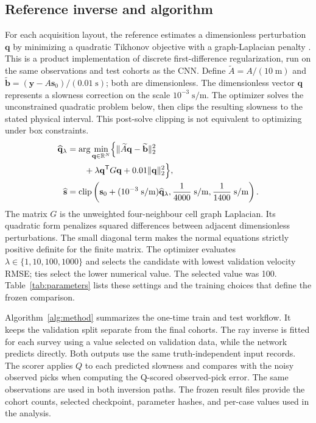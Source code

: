 \documentclass[11pt]{article}
\begin{document}
\subsection{Reference inverse and algorithm}
\label{sec:reference}
For each acquisition layout, the reference estimates a dimensionless perturbation $\mathbf{q}$ by minimizing a quadratic Tikhonov objective with a graph-Laplacian penalty \cite{Tikhonov1977}. This is a product implementation of discrete first-difference regularization, run on the same observations and test cohorts as the CNN. Define $\widetilde A=A/(10\;\mathrm{m})$ and $\widetilde{\mathbf b}=(\mathbf{y}-A\mathbf{s}_0)/(0.01\;\mathrm{s})$; both are dimensionless. The dimensionless vector $\mathbf q$ represents a slowness correction on the scale $10^{-3}\;\mathrm{s/m}$. The optimizer solves the unconstrained quadratic problem below, then clips the resulting slowness to the stated physical interval. This post-solve clipping is not equivalent to optimizing under box constraints.
\begin{equation}
\begin{aligned}
\widehat{\mathbf q}_{\lambda}&=\arg\min_{\mathbf q\in\mathbb R^N}\Bigl\{
\|\widetilde A\mathbf q-\widetilde{\mathbf b}\|_2^2\\
&\qquad+\lambda\mathbf q^{\mathsf T}G\mathbf q+0.01\|\mathbf q\|_2^2\Bigr\},\\
\widehat{\mathbf{s}}&=\operatorname{clip}\left(\mathbf{s}_0+(10^{-3}\;\mathrm{s/m})\widehat{\mathbf q}_{\lambda},\frac{1}{4000}\;\mathrm{s/m},\frac{1}{1400}\;\mathrm{s/m}\right).
\end{aligned}
\label{eq:reference}
\end{equation}
The matrix $G$ is the unweighted four-neighbour cell graph Laplacian. Its quadratic form penalizes squared differences between adjacent dimensionless perturbations. The small diagonal term makes the normal equations strictly positive definite for the finite matrix. The optimizer evaluates $\lambda\in\{1,10,100,1000\}$ and selects the candidate with lowest validation velocity RMSE; ties select the lower numerical value. The selected value was 100. Table~\ref{tab:parameters} lists these settings and the training choices that define the frozen comparison.

Algorithm~\ref{alg:method} summarizes the one-time train and test workflow. It keeps the validation split separate from the final cohorts. The ray inverse is fitted for each survey using a value selected on validation data, while the network predicts directly. Both outputs use the same truth-independent input records. The scorer applies $Q$ to each predicted slowness and compares with the noisy observed picks when computing the Q-scored observed-pick error. The same observations are used in both inversion paths. The frozen result files provide the cohort counts, selected checkpoint, parameter hashes, and per-case values used in the analysis.
\end{document}
